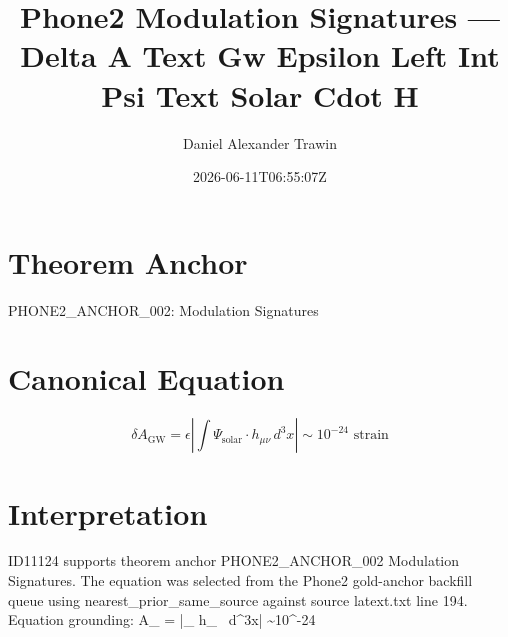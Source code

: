 \documentclass[11pt]{article}
\title{Phone2 Modulation Signatures — Delta A Text Gw Epsilon Left Int Psi Text Solar Cdot H}
\author{Daniel Alexander Trawin}
\date{2026-06-11T06:55:07Z}
\begin{document}
\maketitle
\section*{Theorem Anchor}
PHONE2_ANCHOR_002: Modulation Signatures
\section*{Canonical Equation}
\[
\delta A_{\text{GW}} = \epsilon \left|\int \Psi_{\text{solar}} \cdot h_{\mu\nu} \, d^3x\right| \sim 10^{-24} \text{ strain}
\]
\section*{Interpretation}
ID11124 supports theorem anchor PHONE2_ANCHOR_002 Modulation Signatures. The equation was selected from the Phone2 gold-anchor backfill queue using nearest_prior_same_source against source latext.txt line 194. Equation grounding: \delta A_{} = \epsilon \left|\int \Psi_{} \cdot h_{\mu\nu} \, d^3x\right| \sim 10^{-24} 
\end{document}
